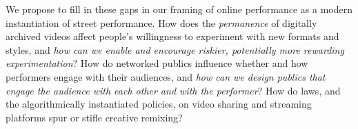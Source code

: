 \documentclass[10pt]{article}
\newcommand{\topic}[1]{{\color{Blue}#1}}
\begin{document}
\topic{We propose to fill in these gaps in our framing of online performance as a modern instantiation of street performance.}
How does the \textit{permanence} of digitally archived videos affect people's willingness to experiment with new formats and styles,
and \textit{how can we enable and encourage riskier, potentially more rewarding experimentation}?
How do networked publics influence whether and how performers engage with their audiences,
and \textit{how can we design publics that engage the audience with each other and with the performer}?
How do laws, and the algorithmically instantiated policies, on video sharing and streaming platforms spur or stifle creative remixing?


\end{document}

